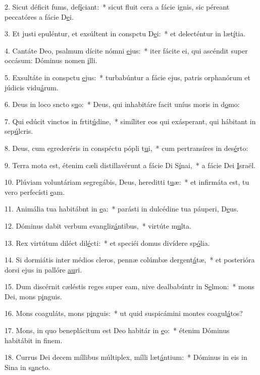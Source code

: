 2. Sicut déficit fums, def\uline{í}ciant:~* sicut fluit cera a fácie ignis, sic péreant peccatóres a fácie D\uline{e}i.\par 
3. Et justi epuléntur, et exsúltent in conspctu D\uline{e}i:~* et delecténtur in læt\uline{í}tia.\par 
4. Cantáte Deo, psalmum dícite nómni \uline{e}jus:~* iter fácite ei, qui ascéndit super occásum: Dóminus nomen \uline{i}lli.\par 
5. Exsultáte in conspctu \uline{e}jus:~* turbabúntur a fácie ejus, patris orphanórum et júdicis vidu\uline{á}rum.\par 
6. Deus in loco sncto s\uline{u}o:~* Deus, qui inhabitáre facit uníus moris in d\uline{o}mo:\par 
7. Qui edúcit vinctos in frtit\uline{ú}dine,~* simíliter eos qui exásperant, qui hábitant in sep\uline{ú}lcris.\par 
8. Deus, cum egrederéris in conspéctu pópli t\uline{u}i,~* cum pertransíres in des\uline{é}rto:\par 
9. Terra mota est, étenim cæli distillavérunt a fácie Di S\uline{í}nai,~* a fácie Dei \uline{I}sraël.\par 
10. Plúviam voluntáriam segregábis, Deus, hereditti t\uline{u}æ:~* et infirmáta est, tu vero perfecísti \uline{e}am.\par 
11. Animália tua habitábnt in \uline{e}a:~* parásti in dulcédine tua páuperi, D\uline{e}us.\par 
12. Dóminus dabit verbum evangliz\uline{á}ntibus,~* virtúte m\uline{u}lta.\par 
13. Rex virtútum diléct dil\uline{é}cti:~* et speciéi domus divídere sp\uline{ó}lia.\par 
14. Si dormiátis inter médios cleros, pennæ colúmbæ dergent\uline{á}tæ,~* et posterióra dorsi ejus in pallóre \uline{au}ri.\par 
15. Dum discérnit cæléstis reges super eam, nive dealbabúntr in S\uline{e}lmon:~* mons Dei, mons p\uline{i}nguis.\par 
16. Mons coaguláts, mons p\uline{i}nguis:~* ut quid suspicámini montes coagul\uline{á}tos?\par 
17. Mons, in quo beneplácitum est Deo habitár in \uline{e}o:~* étenim Dóminus habitábit in f\uline{i}nem.\par 
18. Currus Dei decem míllibus múltiplex, mílli læt\uline{á}ntium:~* Dóminus in eis in Sina in s\uline{a}ncto.\par 

